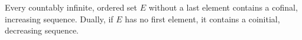Every countably infinite, ordered set $E$ without a last element contains a cofinal, increasing sequence. Dually, if $E$ has no first element, it contains a coinitial, decreasing sequence.